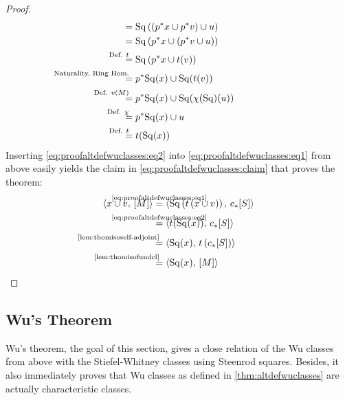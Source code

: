 \begin{Thm}
\begin{proof}
\begin{align}
      &=
        \SQ\left(\left(\pb p x\cup \pb p\Vu\right) \cup \U\right)
      \\\notag
      &=
        \SQ\left(\pb p x\cup \left(\pb p\Vu \cup \U\right)\right)
      \\\notag
      &\equalsby{Def. $\thomiso$}
       \SQ\left(\pb p x\cup \thomiso(\Vu)\right)
      \\\notag
      &\equalsby{Naturality, Ring Hom.}
        \pb p\SQ(x) \cup \SQ(\thomiso(\Vu))
      \\\notag
      &\equalsby{Def. $\V{M}$}
        \pb p\SQ(x) \cup \SQ(\antipode(\SQ)(u))
      \\\notag
      &\equalsby{Def. $\antipode$}
        \pb p\SQ(x) \cup u
      \\\label{eq:proofaltdefwuclasses:eq2}
      &\equalsby{Def. $\thomiso$}
        \thomiso(\SQ(x))
    \end{align}
    Inserting \eqref{eq:proofaltdefwuclasses:eq2} into
    \eqref{eq:proofaltdefwuclasses:eq1} from above easily yields the
    claim in \eqref{eq:proofaltdefwuclasses:claim} that proves the theorem:
    \begin{align*}
      \capped{x\cup \Vu}{\fundcl M}
      &\cequalsby{\eqref{eq:proofaltdefwuclasses:eq1}}
        \capped
        {\SQ\left(\thomiso\left(x\cup\Vu\right)\right)}
        {\pf\collapse\fundcl{\Sph}}
      \\
      &\cequalsby{\eqref{eq:proofaltdefwuclasses:eq2}}
        \capped
        {\thomiso(\SQ(x))}
        {\pf\collapse\fundcl{\Sph}}
      \\
      &\equalsby{\autoref{lem:thomisoself-adjoint}}
        \capped
        {\SQ(x)}
        {\thomiso\left(\pf\collapse\fundcl{\Sph}\right)}
      \\
      &\equalsby{\autoref{lem:thomisofundcl}}
        \capped
        {\SQ(x)}
        {\fundcl M}
        \qedhere
    \end{align*}
  \end{proof}
\end{Thm}


\subsection{Wu's Theorem}\label{sec:wutheorem}
Wu's theorem, the goal of this section, gives a close relation of
the Wu classes from above with the Stiefel-Whitney classes using
Steenrod squares. Besides, it also immediately proves that Wu classes
as defined in \autoref{thm:altdefwuclasses} are actually characteristic
classes.

